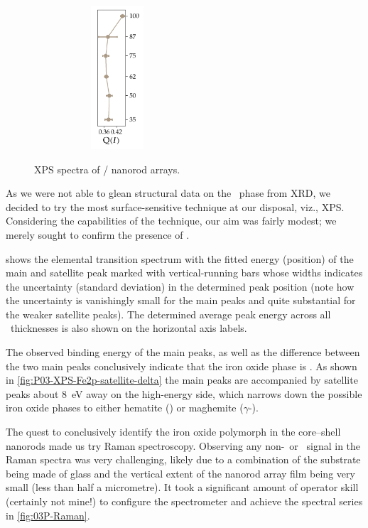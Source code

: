 \documentclass[draft,webedition,openright,titles,swedish,english]{LuaUUThesis}\usepackage[]{graphicx}\usepackage[]{xcolor}
\newenvironment{knitrout}{}{} %
\newcommand{\viz}{viz.}
\begin{document}
\begin{figure}[tbp]
\begin{subfigure}[b]{0.33\textwidth}
\begin{subfigure}[b]{0.50\linewidth}
\begin{knitrout}
{\centering \includegraphics[width=0.77in]{figure/0503P-fig-xps-Fe2p-main-ratio-1} 

}


\end{knitrout}
\caption{}%
\label{fig:P03-XPS-Fe2p-main-ratio}%
\end{subfigure}%
\end{subfigure}%
\caption[XPS spectra of \ZnO/ nanorod arrays]{%
   XPS spectra of / nanorod arrays.}
\label{fig:P03-XPS-Fe2p}%
\end{figure}

As we were not able to glean structural data on the \ironox\ phase from \gls{XRD},
we decided to try the most surface-sensitive technique at our disposal, \viz,
\gls{XPS}. Considering the capabilities of the technique, our aim was fairly modest;
we merely sought to confirm the presence of \hematite.

 shows the  elemental transition spectrum
with the fitted energy (position) of the main and satellite peak marked with
vertical-running bars whose widths indicates the uncertainty (standard deviation) in the determined
peak position (note how the uncertainty is vanishingly small for the main peaks
and quite substantial for the weaker satellite peaks).
The determined average peak energy across all \ironox\ thicknesses is also
shown on the horizontal axis labels.

The observed binding energy of the main peaks, as well as the difference between
the two main peaks conclusively indicate that the iron oxide phase is \ironox.
As shown in \cref{fig:P03-XPS-Fe2p-satellite-delta} the main peaks are
accompanied by satellite peaks about \qty{8}{\eV} away on the high-energy side,
which narrows down the possible iron oxide phases to either hematite (\hematite)
or maghemite ($\gamma$-).




The quest to conclusively identify the iron oxide polymorph in the core--shell
nanorods made us try Raman spectroscopy. Observing any non-\ZnO\ or \tinox\ signal
in the Raman spectra was very challenging, likely due to a combination of the
substrate being made of glass and the vertical extent of the nanorod array film
being very small (less than half a micrometre).
It took a significant amount of operator skill (certainly not mine!) to configure
the spectrometer and achieve the spectral series in \cref{fig:03P-Raman}.
\end{document}
